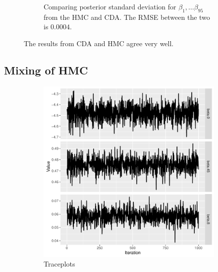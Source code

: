 \documentclass[10pt]{article}
\begin{document}
\begin{figure}[H]
\begin{subfigure}[b]{0.45\textwidth}
 \caption{Comparing posterior standard deviation for $\beta_1,\dots \beta_{95}$ from the HMC and CDA.  The  RMSE between the two is $0.0004$.}
 \end{subfigure}  
 \caption{The results from CDA and HMC agree very well.}
 \end{figure}

\subsection{Mixing of HMC}


 \begin{figure}[H]
   \begin{subfigure}[b]{0.45\textwidth}
 \includegraphics[width=1\textwidth]{traceplot_poisson_hmc.pdf}
 \caption{Traceplots}
 \end{subfigure}
  \hfill 
 \begin{subfigure}[b]{0.45\textwidth}

\end{subfigure}
\end{figure}
\end{document}
